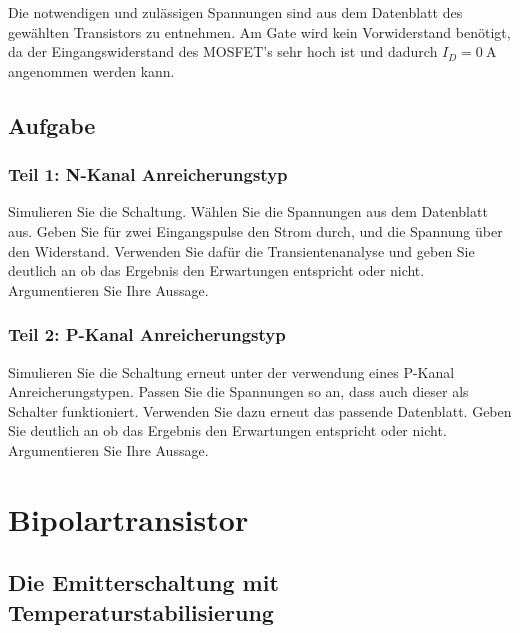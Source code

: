 \documentclass[
  letterpaper,
  DIV=11]{scrreprt}
\begin{document}
Die notwendigen und zulässigen Spannungen sind aus dem Datenblatt des
gewählten Transistors zu entnehmen. Am Gate wird kein Vorwiderstand
benötigt, da der Eingangswiderstand des MOSFET's sehr hoch ist und
dadurch \(I_D = 0 \ \mathrm{A}\) angenommen werden kann.

\hypertarget{aufgabe}{%
\subsection{Aufgabe}\label{aufgabe}}

\hypertarget{teil-1-n-kanal-anreicherungstyp}{%
\subsubsection{Teil 1: N-Kanal
Anreicherungstyp}\label{teil-1-n-kanal-anreicherungstyp}}

Simulieren Sie die Schaltung. Wählen Sie die Spannungen aus dem
Datenblatt aus. Geben Sie für zwei Eingangspulse den Strom durch, und
die Spannung über den Widerstand. Verwenden Sie dafür die
Transientenanalyse und geben Sie deutlich an ob das Ergebnis den
Erwartungen entspricht oder nicht. Argumentieren Sie Ihre Aussage.

\hypertarget{teil-2-p-kanal-anreicherungstyp}{%
\subsubsection{Teil 2: P-Kanal
Anreicherungstyp}\label{teil-2-p-kanal-anreicherungstyp}}

Simulieren Sie die Schaltung erneut unter der verwendung eines P-Kanal
Anreicherungstypen. Passen Sie die Spannungen so an, dass auch dieser
als Schalter funktioniert. Verwenden Sie dazu erneut das passende
Datenblatt. Geben Sie deutlich an ob das Ergebnis den Erwartungen
entspricht oder nicht. Argumentieren Sie Ihre Aussage.

\hypertarget{bipolartransistor}{%
\section{Bipolartransistor}\label{bipolartransistor}}

\hypertarget{die-emitterschaltung-mit-temperaturstabilisierung}{%
\subsection{Die Emitterschaltung mit
Temperaturstabilisierung}\label{die-emitterschaltung-mit-temperaturstabilisierung}}
\end{document}
